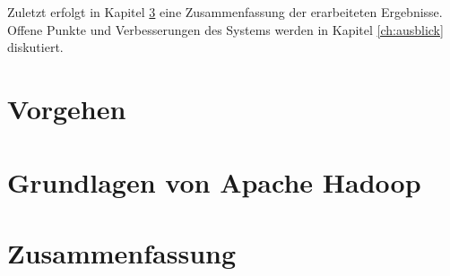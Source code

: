 \documentclass[11pt,a4paper]{report} %
\begin{document}
\noindent
Zuletzt erfolgt in Kapitel \ref{ch:zusammenfassung} eine Zusammenfassung der erarbeiteten Ergebnisse. Offene Punkte und Verbesserungen des Systems werden in Kapitel \ref{ch:ausblick} diskutiert. 


\chapter{Vorgehen}
\label{ch:development_approach}




\chapter{Grundlagen von Apache Hadoop\textsuperscript{\textregistered}}
\label{ch:theory_hadoop}








\chapter{Zusammenfassung}
\label{ch:zusammenfassung}

%
%
%

%
\end{document}
